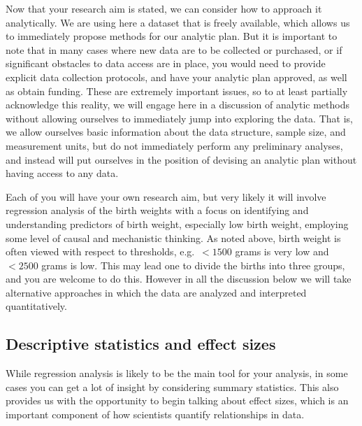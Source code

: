Now that your research aim is stated, we can consider how to approach it analytically.  We are using here a dataset that is freely available, which allows us to immediately propose methods for our analytic plan.  But it is important to note that in many cases where new data are to be collected or purchased, or if significant obstacles to data access are in place, you would need to provide explicit data collection protocols, and have your analytic plan approved, as well as obtain funding.  These are extremely important issues, so to at least partially acknowledge this reality, we will engage here in a discussion of analytic methods without allowing ourselves to immediately jump into exploring the data.  That is, we allow ourselves basic information about the data structure, sample size, and measurement units, but do not immediately perform any preliminary analyses, and instead will put ourselves in the position of devising an analytic plan without having access to any data.

Each of you will have your own research aim, but very likely it will involve regression analysis of the birth weights with a focus on identifying and understanding predictors of birth weight, especially low birth weight, employing some level of causal and mechanistic thinking.  As noted above, birth weight is often viewed with respect to thresholds, e.g.\ $<1500$ grams is very low and $<2500$ grams is low.  This may lead one to divide the births into three groups, and you are welcome to do this.  However in all the discussion below we will take alternative approaches in which the data are analyzed and interpreted quantitatively.

\subsection{Descriptive statistics and effect sizes}

While regression analysis is likely to be the main tool for your analysis, in some cases you can get a lot of insight by considering summary statistics.  This also provides us with the opportunity to begin talking about effect sizes, which is an important component of how scientists quantify relationships in data.

